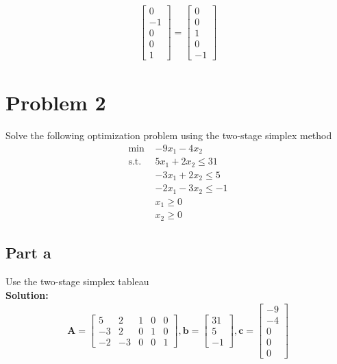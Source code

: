 \documentclass[11pt]{article}
\begin{document}
\begin{enumerate}
\begin{align*}
      \begin{bmatrix}
        0 \\ -1 \\ 0 \\ 0 \\ 1
      \end{bmatrix}
      =
      \begin{bmatrix}
        0 \\ 0 \\ 1 \\ 0 \\ -1
      \end{bmatrix}
    \end{align*}
\end{enumerate}

\section{Problem 2}
Solve the following optimization problem using the two-stage simplex method
\[
\begin{aligned}
\text{min } & -9x_1 - 4x_2 \\
\text{s.t. } & 5x_1 + 2x_2 \leq 31 \\
& -3x_1 + 2x_2 \leq 5 \\
& -2x_1 - 3x_2 \leq -1 \\
& x_1 \geq 0 \\
& x_2 \geq 0
\end{aligned}
\]

\subsection{Part a}
Use the two-stage simplex tableau
\\
\textbf{Solution: }
\begin{align*}
  \textbf{A} =
  \begin{bmatrix}
     5 & 2 & 1 & 0 & 0 \\
     -3 & 2 & 0 & 1 & 0 \\
     -2 & -3 & 0 & 0 & 1 
  \end{bmatrix},
  \textbf{b} = 
  \begin{bmatrix}
    31 \\ 5 \\ -1
  \end{bmatrix},
  \textbf{c} = 
  \begin{bmatrix}
    -9 \\ -4 \\ 0 \\ 0 \\ 0
  \end{bmatrix}
\end{align*}
\end{document}
